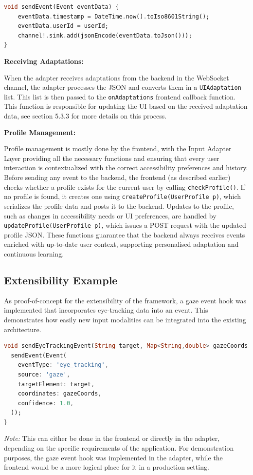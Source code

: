 \documentclass[openany]{book}
\begin{document}
\begin{lstlisting}[language=Dart,basicstyle=\ttfamily\small,caption={sendEvent: serialize and send over WS}]
void sendEvent(Event eventData) {
    eventData.timestamp = DateTime.now().toIso8601String();
    eventData.userId = userId;
    channel!.sink.add(jsonEncode(eventData.toJson()));
}
\end{lstlisting}

\textbf{Receiving Adaptations:}

When the adapter receives adaptations from the backend in the WebSocket channel, the adapter processes the JSON and converts them in a \texttt{UIAdaptation} list. This list is then passed to the \texttt{onAdaptations} frontend callback function. This function is responsible for updating the UI based on the received adaptation data, see section 5.3.3 for more details on this process.

\textbf{Profile Management:}

Profile management is mostly done by the frontend, with the Input Adapter Layer providing all the necessary functions and ensuring that every user interaction is contextualized with the correct accessibility preferences and history. Before sending any event to the backend, the frontend (as described earlier) checks whether a profile exists for the current user by calling \texttt{checkProfile()}. If no profile is found, it creates one using \texttt{createProfile(UserProfile p)}, which serializes the profile data and posts it to the backend. Updates to the profile, such as changes in accessibility needs or UI preferences, are handled by \texttt{updateProfile(UserProfile p)}, which issues a POST request with the updated profile JSON. These functions guarantee that the backend always receives events enriched with up-to-date user context, supporting personalised adaptation and continuous learning.

\subsection{Extensibility Example}
As proof-of-concept for the extensibility of the framework, a gaze event hook was implemented that incorporates eye-tracking data into an event. This demonstrates how easily new input modalities can be integrated into the existing architecture.
\begin{lstlisting}[language=Dart,basicstyle=\ttfamily\small,caption={Gaze event hook (testing harness)}]
void sendEyeTrackingEvent(String target, Map<String,double> gazeCoords) {
  sendEvent(Event(
    eventType: 'eye_tracking',
    source: 'gaze',
    targetElement: target,
    coordinates: gazeCoords,
    confidence: 1.0,
  ));
}
\end{lstlisting}
\textit{Note:} This can either be done in the frontend or directly in the adapter, depending on the specific requirements of the application. For demonstration purposes, the gaze event hook was implemented in the adapter, while the frontend would be a more logical place for it in a production setting.
\end{document}
